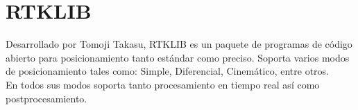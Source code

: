 
\section{RTKLIB}

Desarrollado por Tomoji Takasu, RTKLIB es un paquete de programas de código abierto para posicionamiento tanto estándar como preciso. Soporta varios modos de posicionamiento tales como: Simple, Diferencial, Cinemático, entre otros. \\

En todos sus modos soporta tanto procesamiento en tiempo real así como postprocesamiento.